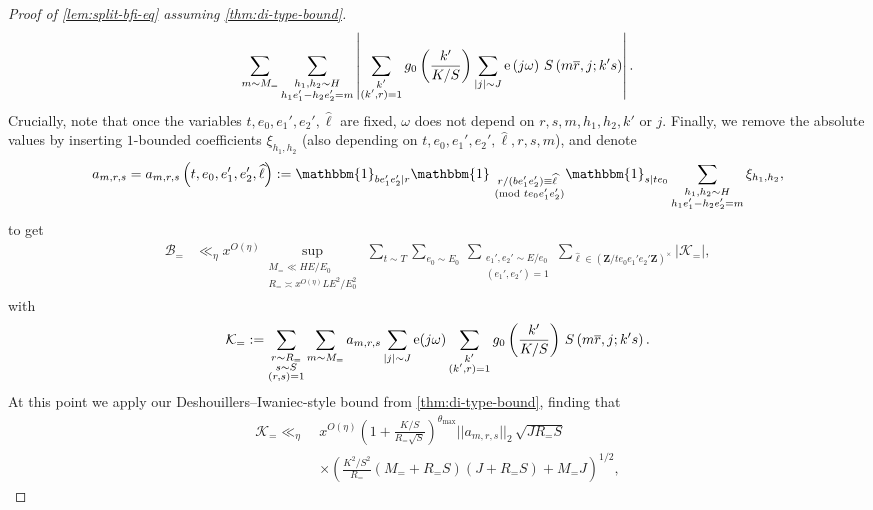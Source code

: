 \documentclass[reqno,11pt]{amsart}
\theoremstyle{definition}
\theoremstyle{remark}
\numberwithin{equation}{section}
\newcommand{\Z}{\mathbf{Z}}
\newcommand{\mK}{\mathcal{K}}
\newcommand{\mB}{\mathcal{B}}
\newcommand{\e}{\textnormal{e}}
\newcommand{\one}{\mathbbm{1}}
\renewcommand{\bar}{\overline}
\renewcommand{\hat}{\widehat}
\renewcommand{\pmod}[1]{\ (\textnormal{mod } #1)}
\begin{document}
\begin{proof}[Proof of \cref{lem:split-bfi-eq} assuming \cref{thm:di-type-bound}]
\[\begin{aligned}
    \sum_{m \sim M_=}
    \sum_{\substack{h_1, h_2 \sim H \\ h_1e_1' - h_2e_2' = m}}
    \left\vert 
    \sum_{\substack{k' \\ (k', r) = 1}} g_0 \left(\frac{k'}{K/S}\right) 
    \sum_{|j| \sim J}
    \e\left(j \omega \right)\, S\left(m \bar{r}, j; k's \right)
    \right\vert.
\end{aligned}
\]
Crucially, note that once the variables $t, e_0, e_1', e_2', \hat{\ell}$ are fixed, $\omega$ does not depend on $r, s, m, h_1, h_2, k'$ or $j$. Finally, we remove the absolute values by inserting $1$-bounded coefficients $\xi_{h_1,h_2}$ (also depending on $t, e_0, e_1', e_2', \hat{\ell}, r, s, m$), and denote
\[
    a_{m,r,s} = a_{m,r,s}\left(t, e_0, e_1', e_2', \hat{\ell}\right) := 
    \one_{b e_1'e_2' \mid r}
    \one_{\substack{r/(be_1'e_2') \equiv \hat{\ell} \\ \pmod{te_0e_1'e_2'}}}
    \one_{s \mid te_0}
    \sum_{\substack{h_1, h_2 \sim H \\ h_1e_1' - h_2e_2' = m}} 
    \xi_{h_1, h_2},
\]
to get
\begin{equation} \label{eq:b-eq-bound}
\begin{aligned}
    \mB_{=} 
    &\ll_\eta x^{O(\eta)}
    \sup_{\substack{M_= \ll HE/E_0 \\ R_= \asymp x^{O(\eta)} LE^2/E_0^2}}\,
    \sum_{t \sim T} \sum_{e_0 \sim E_0}\,
    \sum_{\substack{e_1', e_2' \sim E/e_0 \\ (e_1', e_2') = 1}} \sum_{\hat{\ell} \in (\Z/te_0e_1'e_2'\Z)^\times}
    |\mK_{=}|,
\end{aligned}
\end{equation}
with
\[
    \mK_{=} := 
    \sum_{\substack{r \sim R_= \\ s \sim S \\ (r, s) = 1}}
    \sum_{m \sim M_{=}} a_{m,r,s}
    \sum_{|j| \sim J} \e(j \omega)
    \sum_{\substack{k' \\ (k', r) = 1}} 
    g_0 \left(\frac{k'}{K/S}\right)\, S\left(m\bar{r}, j; k's \right).
\]
At this point we apply our Deshouillers--Iwaniec-style bound from \cref{thm:di-type-bound}, finding that
\[
\begin{aligned}
    \mK_{=} 
    \ll_\eta\ &x^{O(\eta)} 
    \left(1 + \frac{K/S}{R_= \sqrt{S}}\right)^{\theta_{\max}} ||a_{m,r,s}||_2 \, \sqrt{J R_= S}
    \\ 
    &\times 
    \left(\frac{K^2/S^2}{R_=} \left(M_{=} + R_=S\right)\left(J + R_=S\right) + M_{=}J \right)^{1/2},
\end{aligned}
\]
\end{proof}
\end{document}
